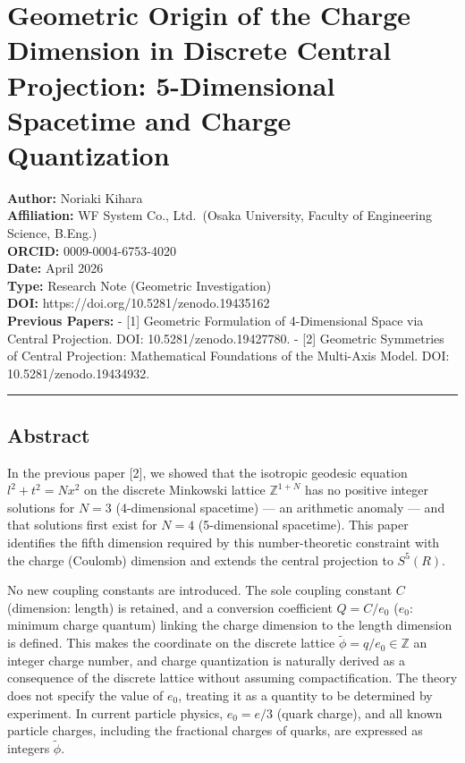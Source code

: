 \documentclass[a4paper,11pt]{article}
\theoremstyle{definition}
\begin{document}
\section{Geometric Origin of the Charge Dimension in Discrete Central Projection: 5-Dimensional Spacetime and Charge Quantization}\label{geometric-origin-of-the-charge-dimension-in-discrete-central-projection-5-dimensional-spacetime-and-charge-quantization}

\textbf{Author:} Noriaki Kihara\\
\textbf{Affiliation:} WF System Co., Ltd.~(Osaka University, Faculty of Engineering Science, B.Eng.)\\
\textbf{ORCID:} 0009-0004-6753-4020\\
\textbf{Date:} April 2026\\
\textbf{Type:} Research Note (Geometric Investigation)\\
\textbf{DOI:} https://doi.org/10.5281/zenodo.19435162\\
\textbf{Previous Papers:} - {[}1{]} Geometric Formulation of 4-Dimensional Space via Central Projection. DOI: 10.5281/zenodo.19427780. - {[}2{]} Geometric Symmetries of Central Projection: Mathematical Foundations of the Multi-Axis Model. DOI: 10.5281/zenodo.19434932.

\begin{center}\rule{0.5\linewidth}{0.5pt}\end{center}

\subsection{Abstract}\label{abstract}

In the previous paper {[}2{]}, we showed that the isotropic geodesic equation \(l^2 + t^2 = Nx^2\) on the discrete Minkowski lattice \(\mathbb{Z}^{1+N}\) has no positive integer solutions for \(N = 3\) (4-dimensional spacetime) --- an arithmetic anomaly --- and that solutions first exist for \(N = 4\) (5-dimensional spacetime). This paper identifies the fifth dimension required by this number-theoretic constraint with the charge (Coulomb) dimension and extends the central projection to \(S^5(R)\).

No new coupling constants are introduced. The sole coupling constant \(C\) (dimension: length) is retained, and a conversion coefficient \(Q = C/e_0\) (\(e_0\): minimum charge quantum) linking the charge dimension to the length dimension is defined. This makes the coordinate on the discrete lattice \(\tilde{\phi} = q/e_0 \in \mathbb{Z}\) an integer charge number, and charge quantization is naturally derived as a consequence of the discrete lattice without assuming compactification. The theory does not specify the value of \(e_0\), treating it as a quantity to be determined by experiment. In current particle physics, \(e_0 = e/3\) (quark charge), and all known particle charges, including the fractional charges of quarks, are expressed as integers \(\tilde{\phi}\).
\end{document}
